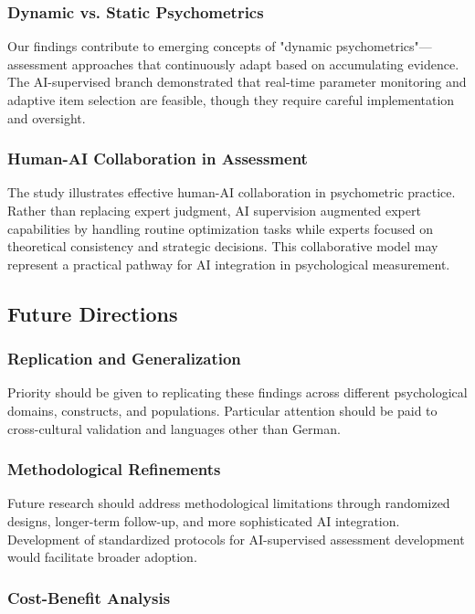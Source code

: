 \documentclass[12pt,a4paper]{article}
\begin{document}
\subsubsection{Dynamic vs. Static Psychometrics}

Our findings contribute to emerging concepts of "dynamic psychometrics"—assessment approaches that continuously adapt based on accumulating evidence. The AI-supervised branch demonstrated that real-time parameter monitoring and adaptive item selection are feasible, though they require careful implementation and oversight.

\subsubsection{Human-AI Collaboration in Assessment}

The study illustrates effective human-AI collaboration in psychometric practice. Rather than replacing expert judgment, AI supervision augmented expert capabilities by handling routine optimization tasks while experts focused on theoretical consistency and strategic decisions. This collaborative model may represent a practical pathway for AI integration in psychological measurement.

\subsection{Future Directions}

\subsubsection{Replication and Generalization}

Priority should be given to replicating these findings across different psychological domains, constructs, and populations. Particular attention should be paid to cross-cultural validation and languages other than German.

\subsubsection{Methodological Refinements}

Future research should address methodological limitations through randomized designs, longer-term follow-up, and more sophisticated AI integration. Development of standardized protocols for AI-supervised assessment development would facilitate broader adoption.

\subsubsection{Cost-Benefit Analysis}
\end{document}

